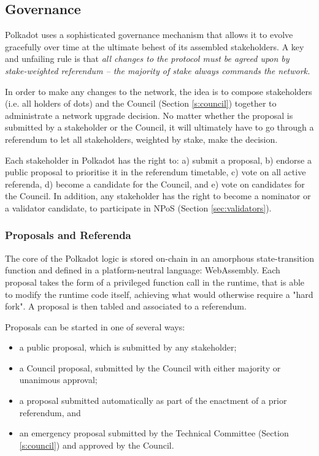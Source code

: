 \subsection{Governance}\label{sec:governance}

Polkadot uses a sophisticated governance mechanism that allows it to evolve gracefully over time at the ultimate behest of its assembled stakeholders. A key and unfailing rule is that \emph{all changes to the protocol must be agreed upon by stake-weighted referendum -- the majority of stake always commands the network.}

In order to make any changes to the network, the idea is to compose stakeholders (i.e. all holders of dots) and the Council (Section \ref{s:council}) together to administrate a network upgrade decision. No matter whether the proposal is submitted by a stakeholder or the Council, it will ultimately have to go through a referendum to let all stakeholders, weighted by stake, make the decision.

Each stakeholder in Polkadot has the right to: a) submit a proposal, b) endorse a public proposal to prioritise it in the referendum timetable, c) vote on all active referenda, d) become a candidate for the Council, and e) vote on candidates for the Council. In addition, any stakeholder has the right to become a nominator or a validator candidate, to participate in NPoS (Section \ref{sec:validators}).

\subsubsection{Proposals and Referenda}

The core of the Polkadot logic is stored on-chain in an amorphous state-transition function and defined in a platform-neutral language: WebAssembly. Each proposal takes the form of a privileged function call in the runtime, that is able to modify the runtime code itself, achieving what would otherwise require a "hard fork". A proposal is then tabled and associated to a referendum. 

Proposals can be started in one of several ways:
\begin{itemize}
\item a public proposal, which is submitted by any stakeholder;
\item a Council proposal, submitted by the Council with either majority or unanimous approval;
\item a proposal submitted automatically as part of the enactment of a prior referendum, and
\item an emergency proposal submitted by the Technical Committee (Section \ref{s:council}) and approved by the Council.
\end{itemize} 


